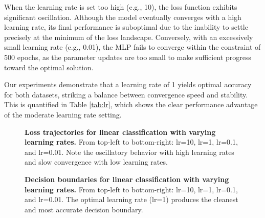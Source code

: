 \documentclass[twocolumn]{extarticle}
\begin{document}
When the learning rate is set too high (e.g., 10), the loss function exhibits significant oscillation. Although the model eventually converges with a high learning rate, its final performance is suboptimal due to the inability to settle precisely at the minimum of the loss landscape. Conversely, with an excessively small learning rate (e.g., 0.01), the MLP fails to converge within the constraint of 500 epochs, as the parameter updates are too small to make sufficient progress toward the optimal solution.

Our experiments demonstrate that a learning rate of 1 yields optimal accuracy for both datasets, striking a balance between convergence speed and stability. This is quantified in Table \ref{tab:lr}, which shows the clear performance advantage of the moderate learning rate setting.

\begin{figure}[H]
\caption{\textbf{Loss trajectories for linear classification with varying learning rates.} From top-left to bottom-right: lr=10, lr=1, lr=0.1, and lr=0.01. Note the oscillatory behavior with high learning rates and slow convergence with low learning rates.}
\label{fig:loss_linear}
\end{figure}

\begin{figure}[H]
\caption{\textbf{Decision boundaries for linear classification with varying learning rates.} From top-left to bottom-right: lr=10, lr=1, lr=0.1, and lr=0.01. The optimal learning rate (lr=1) produces the cleanest and most accurate decision boundary.}
\label{fig:res_linear}
\end{figure}
\end{document}
